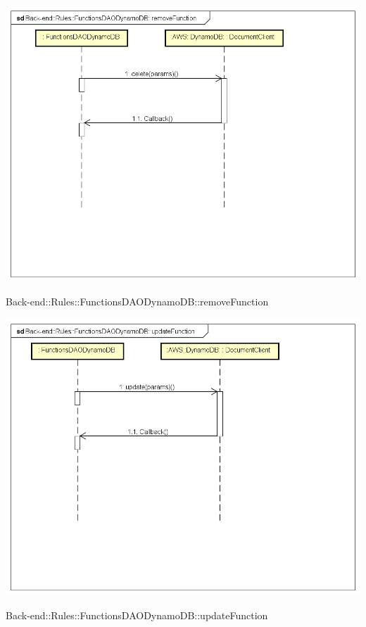 \includegraphics[width=\textwidth,height=\textheight,keepaspectratio]{images/diagrams/back-end/Ufficial_Backend/Back-end__Rules__FunctionsDAODynamoDB__removeFunction.png} 	\caption{Back-end::Rules::FunctionsDAODynamoDB::removeFunction}
\includegraphics[width=\textwidth,height=\textheight,keepaspectratio]{images/diagrams/back-end/Ufficial_Backend/Back-end__Rules__FunctionsDAODynamoDB__updateFunction.png} 	\caption{Back-end::Rules::FunctionsDAODynamoDB::updateFunction}
